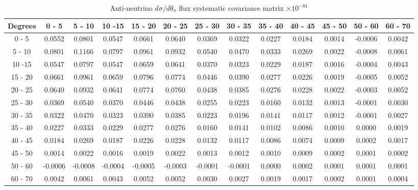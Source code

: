 \documentclass[aps,prl,twocolumn,showpacs,superscriptaddress,nofootinbib]{revtex4}
\begin{document}
\begingroup
\squeezetable
\begin{table}[h]
\tabcolsep=0.11cm
\begin{tabular}{c|cccccccccccc}
Degrees & 0 - 5 & 5 - 10 & 10 -15 & 15 - 20 & 20 - 25 & 25 - 30 & 30 - 35 & 35 - 40 & 40 - 45 & 45 - 50 & 50 - 60 & 60 - 70 \\
\hline
 0 - 5&0.0552 & 0.0801 & 0.0547 & 0.0661 & 0.0640 & 0.0369 & 0.0322 & 0.0227 & 0.0184 & 0.0014 & -0.0006 & 0.0042  \\
 5 - 10 &0.0801 & 0.1166 & 0.0797 & 0.0961 & 0.0932 & 0.0540 & 0.0470 & 0.0333 & 0.0269 & 0.0022 & -0.0008 & 0.0061  \\
10 -15 &0.0547 & 0.0797 & 0.0547 & 0.0659 & 0.0641 & 0.0370 & 0.0323 & 0.0229 & 0.0187 & 0.0016 & -0.0004 & 0.0043  \\
15 - 20 &0.0661 & 0.0961 & 0.0659 & 0.0796 & 0.0774 & 0.0446 & 0.0390 & 0.0277 & 0.0226 & 0.0019 & -0.0005 & 0.0052  \\
20 - 25 &0.0640 & 0.0932 & 0.0641 & 0.0774 & 0.0760 & 0.0438 & 0.0385 & 0.0276 & 0.0228 & 0.0022 & -0.0003 & 0.0052  \\
25 - 30 &0.0369 & 0.0540 & 0.0370 & 0.0446 & 0.0438 & 0.0255 & 0.0223 & 0.0160 & 0.0132 & 0.0013 & -0.0001 & 0.0030  \\
30 - 35 &0.0322 & 0.0470 & 0.0323 & 0.0390 & 0.0385 & 0.0223 & 0.0196 & 0.0141 & 0.0117 & 0.0012 & -0.0001 & 0.0027  \\
35 - 40 &0.0227 & 0.0333 & 0.0229 & 0.0277 & 0.0276 & 0.0160 & 0.0141 & 0.0102 & 0.0086 & 0.0010 & 0.0000 & 0.0019 \\
40 - 45 &0.0184 & 0.0269 & 0.0187 & 0.0226 & 0.0228 & 0.0132 & 0.0117 & 0.0086 & 0.0074 & 0.0009 & 0.0002 & 0.0017  \\
45 - 50 &0.0014 & 0.0022 & 0.0016 & 0.0019 & 0.0022 & 0.0013 & 0.0012 & 0.0010 & 0.0009 & 0.0002 & 0.0001 & 0.0002  \\
50 - 60 &-0.0006 & -0.0008 & -0.0004 & -0.0005 & -0.0003 & -0.0001 & -0.0001 & 0.0000 & 0.0002 & 0.0001 & 0.0001 & 0.0001 \\  
60 - 70 &0.0042 & 0.0061 & 0.0043 & 0.0052 & 0.0052 & 0.0030 & 0.0027 & 0.0019 & 0.0017 & 0.0002 & 0.0001 & 0.0004  \\
 
\end{tabular}
\caption{Anti-neutrino $d\sigma/d\theta_\pi$ flux systematic covariance matrix  $\times 10^{-81}$ }
\label{tab:thpiB-flux}
\end{table}
\endgroup

\clearpage  %
\end{document}
